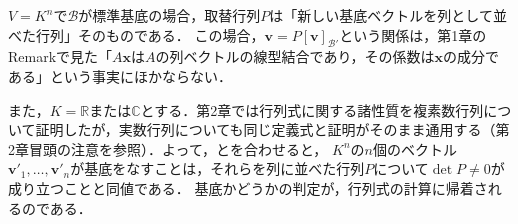 \begin{remark}[標準基底の場合と行列式による判定]
  $V = K^n$で$\mathcal{B}$が標準基底の場合，取替行列$P$は「新しい基底ベクトルを列として並べた行列」そのものである．
  この場合，$\bm{v} = P[\bm{v}]_{\mathcal{B}'}$という関係は，第1章のRemarkで見た「$A\bm{x}$は$A$の列ベクトルの線型結合であり，その係数は$\bm{x}$の成分である」という事実にほかならない．

  また，$K = \mathbb{R}$または$\mathbb{C}$とする．第2章では行列式に関する諸性質を複素数行列について証明したが，実数行列についても同じ定義式と証明がそのまま通用する（第2章冒頭の注意を参照）．よって，とを合わせると，
  $K^n$の$n$個のベクトル$\bm{v}'_1, \dots, \bm{v}'_n$が基底をなすことは，それらを列に並べた行列$P$について$\det P \ne 0$が成り立つことと同値である．
  基底かどうかの判定が，行列式の計算に帰着されるのである．
\end{remark}